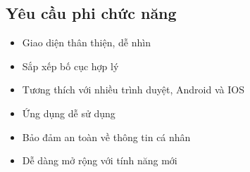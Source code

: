 \par 

\subsection{Yêu cầu phi chức năng}

\begin{itemize}
    \item Giao diện thân thiện, dễ nhìn
    \item Sắp xếp bố cục hợp lý
    \item Tương thích với nhiều trình duyệt, Android và IOS
    \item Ứng dụng dễ sử dụng
    \item Bảo đảm an toàn về thông tin cá nhân
    \item Dễ dàng mở rộng với tính năng mới
\end{itemize}

